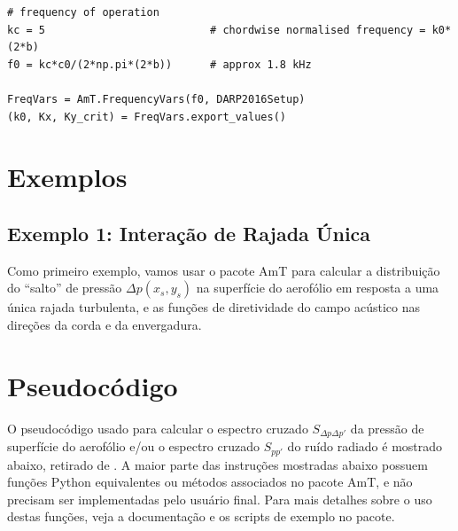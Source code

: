 \documentclass[a4paper, 11pt, twoside]{article}
\begin{document}
\begin{lstlisting}[caption={Criando variáveis relacionadas à frequência},label={lst:FrequencyVars}]
# frequency of operation
kc = 5                          # chordwise normalised frequency = k0*(2*b)
f0 = kc*c0/(2*np.pi*(2*b))      # approx 1.8 kHz

FreqVars = AmT.FrequencyVars(f0, DARP2016Setup)
(k0, Kx, Ky_crit) = FreqVars.export_values()
\end{lstlisting}

\section{Exemplos}

\subsection{Exemplo 1: Interação de Rajada Única}

Como primeiro exemplo, vamos usar o pacote AmT para calcular a distribuição do ``salto'' de pressão $\Delta p(x_s, y_s)$ na superfície do aerofólio em resposta a uma única rajada turbulenta, e as funções de diretividade do campo acústico nas direções da corda e da envergadura.



\clearpage
\newpage
\section{Pseudocódigo}

O pseudocódigo usado para calcular o espectro cruzado $S_{\Delta p \Delta p'}$ da pressão de superfície do aerofólio e/ou o espectro cruzado $S_{pp'}$ do ruído radiado é mostrado abaixo, retirado de \cite{Casagrande_etal2020}. A maior parte das instruções mostradas abaixo possuem funções Python equivalentes ou métodos associados no pacote AmT, e não precisam ser implementadas pelo usuário final. Para mais detalhes sobre o uso destas funções, veja a documentação e os scripts de exemplo no pacote.
\end{document}
